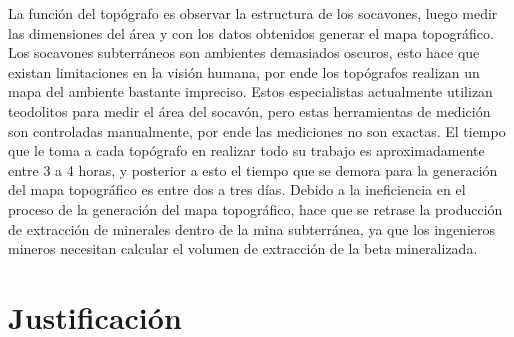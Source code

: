 La función del topógrafo es observar la estructura de los socavones, luego medir las dimensiones del área y con los datos obtenidos generar el mapa topográfico. Los socavones subterráneos son ambientes demasiados oscuros, esto hace que existan  limitaciones en la visión humana, por ende los topógrafos realizan un mapa del ambiente bastante impreciso. Estos especialistas actualmente utilizan teodolitos para medir el área del socavón, pero estas herramientas de medición son controladas manualmente, por ende las mediciones no son exactas. El tiempo que le toma a cada topógrafo en realizar todo su trabajo es aproximadamente entre 3 a 4 horas, y posterior a esto el tiempo que se demora para la generación del mapa topográfico es entre dos a tres días. Debido a la ineficiencia en el proceso de la generación del mapa topográfico, hace que se retrase la producción de extracción de minerales dentro de la mina subterránea, ya que los ingenieros mineros necesitan calcular el volumen de extracción de la beta mineralizada.



\section{Justificación}




